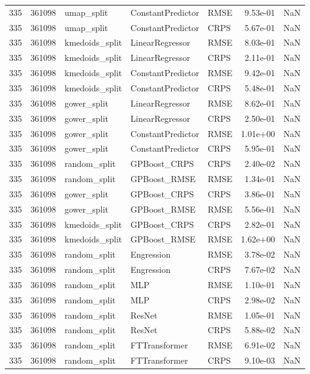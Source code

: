 \begin{tabular}{rrlllrr}
335 & 361098 & umap\_split & ConstantPredictor & RMSE & 9.53e-01 & NaN \\
335 & 361098 & umap\_split & ConstantPredictor & CRPS & 5.67e-01 & NaN \\
335 & 361098 & kmedoids\_split & LinearRegressor & RMSE & 8.03e-01 & NaN \\
335 & 361098 & kmedoids\_split & LinearRegressor & CRPS & 2.11e-01 & NaN \\
335 & 361098 & kmedoids\_split & ConstantPredictor & RMSE & 9.42e-01 & NaN \\
335 & 361098 & kmedoids\_split & ConstantPredictor & CRPS & 5.48e-01 & NaN \\
335 & 361098 & gower\_split & LinearRegressor & RMSE & 8.62e-01 & NaN \\
335 & 361098 & gower\_split & LinearRegressor & CRPS & 2.50e-01 & NaN \\
335 & 361098 & gower\_split & ConstantPredictor & RMSE & 1.01e+00 & NaN \\
335 & 361098 & gower\_split & ConstantPredictor & CRPS & 5.95e-01 & NaN \\
335 & 361098 & random\_split & GPBoost\_CRPS & CRPS & 2.40e-02 & NaN \\
335 & 361098 & random\_split & GPBoost\_RMSE & RMSE & 1.34e-01 & NaN \\
335 & 361098 & gower\_split & GPBoost\_CRPS & CRPS & 3.86e-01 & NaN \\
335 & 361098 & gower\_split & GPBoost\_RMSE & RMSE & 5.56e-01 & NaN \\
335 & 361098 & kmedoids\_split & GPBoost\_CRPS & CRPS & 2.82e-01 & NaN \\
335 & 361098 & kmedoids\_split & GPBoost\_RMSE & RMSE & 1.62e+00 & NaN \\
335 & 361098 & random\_split & Engression & RMSE & 3.78e-02 & NaN \\
335 & 361098 & random\_split & Engression & CRPS & 7.67e-02 & NaN \\
335 & 361098 & random\_split & MLP & RMSE & 1.10e-01 & NaN \\
335 & 361098 & random\_split & MLP & CRPS & 2.98e-02 & NaN \\
335 & 361098 & random\_split & ResNet & RMSE & 1.05e-01 & NaN \\
335 & 361098 & random\_split & ResNet & CRPS & 5.88e-02 & NaN \\
335 & 361098 & random\_split & FTTransformer & RMSE & 6.91e-02 & NaN \\
335 & 361098 & random\_split & FTTransformer & CRPS & 9.10e-03 & NaN \\

\end{tabular}
